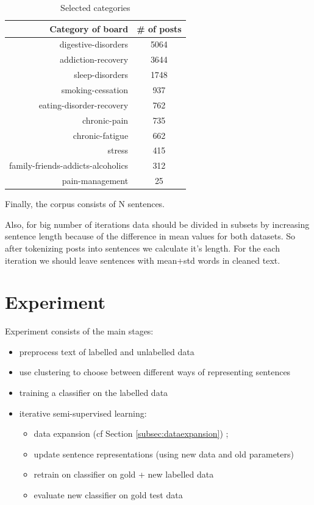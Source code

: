 \documentclass[11pt]{article}
\begin{document}
\begin{table}[htb]
\centering
\begin{tabular}{ |r|c| }
\hline
Category of board &  \# of posts \\ \hline
digestive-disorders & 5064 \\ \hline
addiction-recovery & 3644 \\ \hline
sleep-disorders & 1748 \\ \hline
smoking-cessation & 937 \\ \hline
eating-disorder-recovery & 762 \\ \hline
chronic-pain & 735 \\ \hline
chronic-fatigue & 662 \\ \hline
stress & 415 \\ \hline
family-friends-addicts-alcoholics & 312 \\ \hline
pain-management & 25 \\ \hline
\end{tabular}
\caption{Selected categories}\label{cat_freq}
\end{table}
\FloatBarrier

Finally, the corpus consists of N  sentences. 

Also, for big number of iterations data should be divided in subsets by increasing sentence length because of the difference in mean values for both datasets. So after tokenizing posts into sentences we calculate it's length. For the each iteration we should leave sentences with mean+std words in cleaned text.


\section{Experiment}
\label{sec:xps}

Experiment consists of the main stages:

\begin{itemize}
\item preprocess text of labelled and unlabelled data
\item use clustering to choose between different ways of representing sentences
\item training a classifier on the labelled data
\item iterative semi-supervised learning:
  \begin{itemize}
  \item data expansion (cf Section \ref{subsec:dataexpansion}) ; 
  \item update sentence representations (using new data and old parameters)
  \item retrain on classifier on gold + new labelled data
  \item evaluate new classifier on gold test data
\end{itemize}
\end{itemize}
\end{document}
